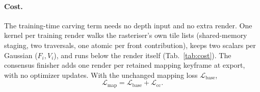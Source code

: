 \paragraph{Cost.}
The training-time carving term needs no depth input and no extra render. One kernel per training render walks the rasteriser's own tile lists (shared-memory
staging, two traversals, one atomic per front contribution), keeps two scalars per Gaussian ($F_i,V_i$), and runs below the render
itself (Tab.~\ref{tab:cost}). The consensus finisher adds one render per retained mapping keyframe at export, with no optimizer updates.
With the unchanged mapping loss $\mathcal L_{\mathrm{base}}$,
\begin{equation}\label{eq:map_objective}
  \mathcal L_{\mathrm{map}}=\mathcal L_{\mathrm{base}}+\mathcal L_{\mathrm{cc}} .
\end{equation}
